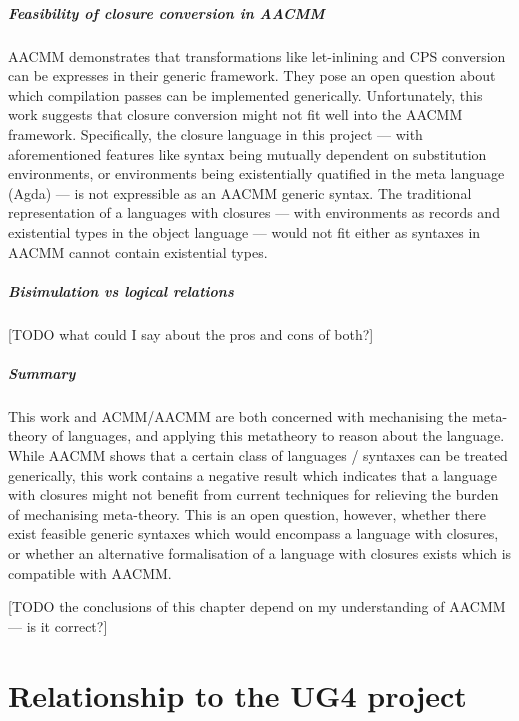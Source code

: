 \documentclass[bsc,frontabs,oneside,singlespacing,parskip,deptreport]{infthesis}
\theoremstyle{definition}
\theoremstyle{lemma}
\begin{document}
\paragraph{Feasibility of closure conversion in AACMM}
AACMM demonstrates that transformations like let-inlining and CPS
conversion can be expresses in their generic framework. They pose an
open question about which compilation passes can be implemented
generically. Unfortunately, this work suggests that closure conversion
might not fit well into the AACMM framework. Specifically, the
closure language in this project --- with aforementioned features like
syntax being mutually dependent on substitution environments, or
environments being existentially quatified in the meta language (Agda)
--- is not expressible as an AACMM generic syntax. The traditional
representation of a languages with closures --- with environments as
records and existential types in the object language --- would not fit
either as syntaxes in AACMM cannot contain existential types.

\paragraph{Bisimulation vs logical relations}
[TODO what could I say about the pros and cons of both?]

\paragraph{Summary}
This work and ACMM/AACMM are both concerned with mechanising the
meta-theory of languages, and applying this metatheory to reason about
the language. While AACMM shows that a certain class of languages /
syntaxes can be treated generically, this work contains a negative
result which indicates that a language with closures might not benefit
from current techniques for relieving the burden of mechanising
meta-theory. This is an open question, however, whether there exist
feasible generic syntaxes which would encompass a language with
closures, or whether an alternative formalisation of a language with
closures exists which is compatible with AACMM.

[TODO the conclusions of this chapter depend on my understanding of
AACMM --- is it correct?]

\chapter{Relationship to the UG4 project}
\end{document}
